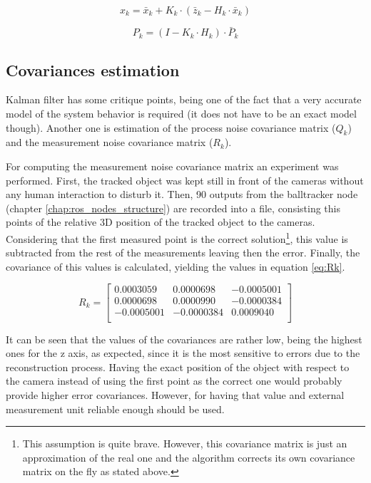 \begin{equation}
x_{k}=\bar{x}_{k}+K_{k} \cdot (\bar{z}_{k}-H_{k} \cdot \bar{x}_{k})
\label{eq:final_state}
\end{equation}

\begin{equation}
P_{k}=(I-K_{k} \cdot H_{k}) \cdot \bar{P}_{k}
\label{eq:error_covariance}
\end{equation}

\subsection{Covariances estimation}
Kalman filter has some critique points, being one of the fact that a very accurate model of the system behavior is required (it does not have to be an exact model though). Another one is estimation of the process noise covariance matrix ($Q_{k}$) and the measurement noise covariance matrix ($R_{k}$).

For computing the measurement noise covariance matrix an experiment was performed. First, the tracked object was kept still in front of the cameras without any human interaction to disturb it. Then, 90 outputs from the balltracker node (chapter \ref{chap:ros_nodes_structure}) are recorded into a file, consisting this points of the relative 3D position of the tracked object to the cameras. Considering that the first measured point is the correct solution\footnote{This assumption is quite brave. However, this covariance matrix is just an approximation of the real one and the algorithm corrects its own covariance matrix on the fly as stated above.}, this value is subtracted from the rest of the measurements leaving then the error. Finally, the covariance of this values is calculated, yielding the values in equation \eqref{eq:Rk}.

\begin{equation}
R_{k}=
\begin{bmatrix}
0.0003059 & 0.0000698 & -0.0005001 \\
0.0000698 & 0.0000990 & -0.0000384 \\
-0.0005001 & -0.0000384 & 0.0009040 \\
\end{bmatrix}
\label{eq:Rk}
\end{equation}

It can be seen that the values of the covariances are rather low, being the highest ones for the z axis, as expected, since it is the most sensitive to errors due to the reconstruction process. Having the exact position of the object with respect to the camera instead of using the first point as the correct one would probably provide higher error covariances. However, for having that value and external measurement unit reliable enough should be used.


